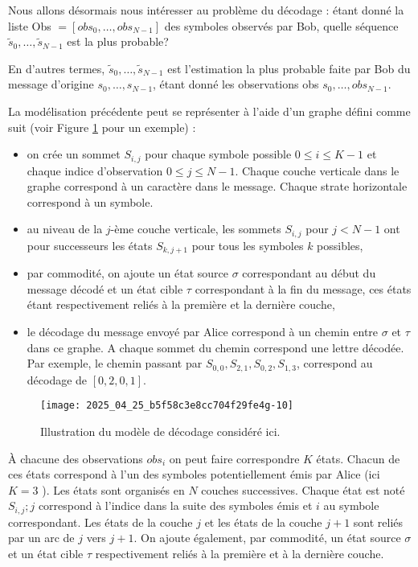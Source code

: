 Nous allons désormais nous intéresser au problème du décodage : étant donné la liste Obs $=\left[o b s_{0}, \ldots, o b s_{N-1}\right]$ des symboles observés par Bob, quelle séquence $\tilde{s}_{0}, \ldots, \tilde{s}_{N-1}$ est la plus probable?

En d'autres termes, $\tilde{s}_{0}, \ldots, \tilde{s}_{N-1}$ est l'estimation la plus probable faite par Bob du message d'origine $s_{0}, \ldots, s_{N-1}$, étant donné les observations obs $s_{0}, \ldots, o b s_{N-1}$.

La modélisation précédente peut se représenter à l'aide d'un graphe défini comme suit (voir Figure \ref{fig_ccmp_2024_info_03} pour un exemple) :

\begin{itemize}
  \item on crée un sommet $S_{i, j}$ pour chaque symbole possible $0 \leqslant i \leqslant K-1$ et chaque indice d'observation $0 \leqslant j \leqslant N-1$. Chaque couche verticale dans le graphe correspond à un caractère dans le message. Chaque strate horizontale correspond à un symbole.
  \item au niveau de la $j$-ème couche verticale, les sommets $S_{i, j}$ pour $j<N-1$ ont pour successeurs les états $S_{k, j+1}$ pour tous les symboles $k$ possibles,
  \item par commodité, on ajoute un état source $\sigma$ correspondant au début du message décodé et un état cible $\tau$ correspondant à la fin du message, ces états étant respectivement reliés à la première et la dernière couche,
  \item le décodage du message envoyé par Alice correspond à un chemin entre $\sigma$ et $\tau$ dans ce graphe. A chaque sommet du chemin correspond une lettre décodée. Par exemple, le chemin passant par $S_{0,0}, S_{2,1}, S_{0,2}, S_{1,3}$, correspond au décodage de $[0,2,0,1]$.\\
\end{itemize}

\begin{figure}
\centering
\texttt{[image: 2025\_04\_25\_b5f58c3e8cc704f29fe4g-10]}
\caption{Illustration du modèle de décodage considéré ici. \label{fig_ccmp_2024_info_03}}
\end{figure}

À chacune des observations $o b s_{i}$ on peut faire correspondre $K$ états. Chacun de ces états correspond à l'un des symboles potentiellement émis par Alice (ici $K=3$ ). Les états sont organisés en $N$ couches successives. Chaque état est noté $S_{i, j} ; j$ correspond à l'indice dans la suite des symboles émis et $i$ au symbole correspondant. Les états de la couche $j$ et les états de la couche $j+1$ sont reliés par un arc de $j$ vers $j+1$. On ajoute également, par commodité, un état source $\sigma$ et un état cible $\tau$ respectivement reliés à la première et à la dernière couche.

